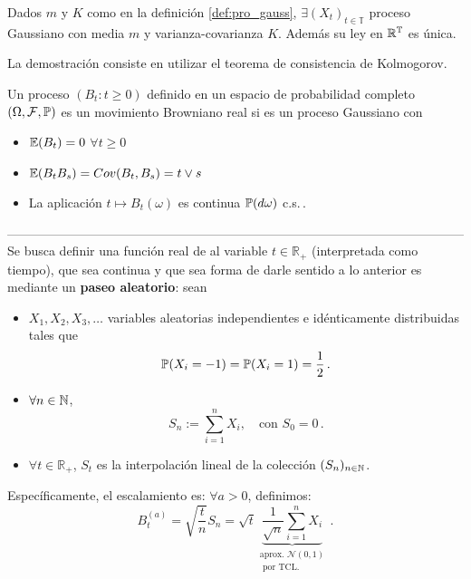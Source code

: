 \begin{theorem}
Dados $m$ y $K$ como en la definición \ref{def:pro_gauss}, $\exists (X_t)_{t\in\mathbb{T}}$ proceso Gaussiano con media $m$ y varianza-covarianza $K$. Además su ley en $\R^{\mathbb{T}}$ es única.
\end{theorem}
La demostración consiste en utilizar el teorema de consistencia de Kolmogorov.

\begin{definition}
Un proceso $(B_t:t\geq 0)$ definido en un espacio de probabilidad completo $\edp$ es un movimiento Browniano real si es un proceso Gaussiano con
\begin{itemize}
    \item $\E(B_t)=0$ \espacio $\forall t\geq 0$
    \item $\E(B_tB_s) = Cov(B_t,B_s) = t \lor s $
    \item La aplicación $t\mapsto B_t(\omega)$ es continua $\P(d\omega)$ c.s.\,.
\end{itemize}
\end{definition}

\newp ------------------------------------------------------------------------------------------------------------
\\
\iffalse
Se busca definir una función real de al variable $t \in \mathbb{R}_{+}$ (interpretada como tiempo), que sea continua y que sea \textit{} forma de darle sentido a lo anterior es mediante un \textbf{paseo aleatorio}: sean 
\begin{itemize}
\item $X_1, X_2, X_3, \ldots $ variables aleatorias independientes e idénticamente distribuidas tales que 
    \begin{equation*}
            \P(X_{i} = -1) = \P(X_i = 1) = \frac{1}{2}\,.
    \end{equation*}
 \item $\forall  n \in \N$,
     \begin{equation*}
             S_n := \sum_{i=1}^{n} X_i, ~ ~ ~ \text{ con } S_0 = 0\,.
     \end{equation*}
 \item $\forall t\in \mathbb{R}_{+}$, $S_t$ es la interpolación lineal de la colección $(S_{n})_{n \in \N}$.
\end{itemize}

Específicamente, el escalamiento es: $\forall a >0$, definimos:
\begin{equation*}
    B_t^{(a)} = \sqrt{\frac{t}{n}}   S_n = \sqrt{t}
    \underbrace{\frac{1}{\sqrt{n} } \sum_{i=1}^{n} X_i}_{\substack{\text{aprox. } \mathcal{N}(0,1) \\ \text{ por TCL.}}}\,.
\end{equation*}

